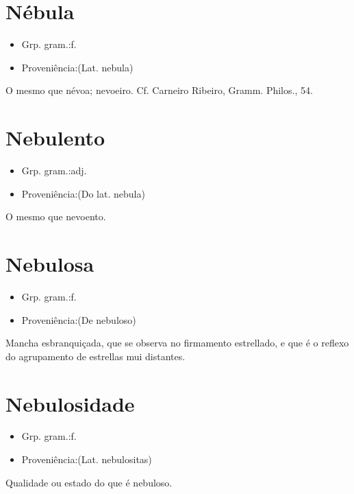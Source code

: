 \section{Nébula}
\begin{itemize}
\item {Grp. gram.:f.}
\end{itemize}
\begin{itemize}
\item {Proveniência:(Lat. \textunderscore nebula\textunderscore )}
\end{itemize}
O mesmo que \textunderscore névoa\textunderscore ; nevoeiro. Cf. Carneiro Ribeiro, \textunderscore Gramm. Philos.\textunderscore , 54.
\section{Nebulento}
\begin{itemize}
\item {Grp. gram.:adj.}
\end{itemize}
\begin{itemize}
\item {Proveniência:(Do lat. \textunderscore nebula\textunderscore )}
\end{itemize}
O mesmo que \textunderscore nevoento\textunderscore .
\section{Nebulosa}
\begin{itemize}
\item {Grp. gram.:f.}
\end{itemize}
\begin{itemize}
\item {Proveniência:(De \textunderscore nebuloso\textunderscore )}
\end{itemize}
Mancha esbranquiçada, que se observa no firmamento estrellado, e que é o reflexo do agrupamento de estrellas mui distantes.
\section{Nebulosidade}
\begin{itemize}
\item {Grp. gram.:f.}
\end{itemize}
\begin{itemize}
\item {Proveniência:(Lat. \textunderscore nebulositas\textunderscore )}
\end{itemize}
Qualidade ou estado do que é nebuloso.
